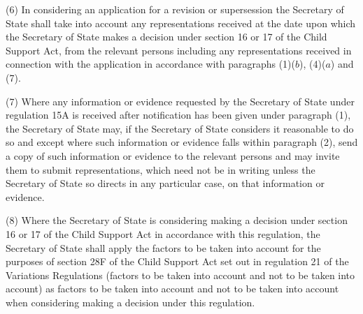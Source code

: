 \documentclass[12pt,a4paper]{article}
\begin{document}
(6) In considering an application for a revision or supersession the 
Secretary of State  %
shall take into account any representations received at the date upon which 
the Secretary of State  %
makes a decision under section 16 or 17 of the Child Support Act, from the relevant persons including any representations received in connection with the application in accordance with paragraphs (1)($b$), (4)($a$)  and (7).

(7) Where any information or evidence requested by the 
Secretary of State  %
under regulation 15A is received after notification has been given under paragraph (1), 
the Secretary of State  %
may, if 
the Secretary of State  %
considers it reasonable to do so and except where such information or evidence falls within paragraph (2), send a copy of such information or evidence to the relevant persons and may invite them to submit representations, which need not be in writing unless the 
Secretary of State  %
so directs in any particular case, on that information or evidence.

(8) Where the 
Secretary of State  %
is considering making a decision under section 16 or 17 of the Child Support Act in accordance with this regulation, 
the Secretary of State  %
shall apply the factors to be taken into account for the purposes of section 28F of the Child Support Act set out in regulation 21 of the Variations Regulations (factors to be taken into account and not to be taken into account) as factors to be taken into account and not to be taken into account when considering making a decision under this regulation.
\end{document}
